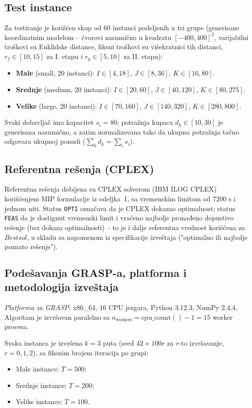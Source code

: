 \documentclass[12pt,a4paper]{article}
\begin{document}
\subsection{Test instance}

Za testiranje je korišćen skup od $60$ instanci podeljenih u tri grupe
(generisane koordinatnim modelom -- čvorovi nasumično u kvadratu
$[-400,400]^2$, varijabilni troškovi su Euklidske distance, fiksni troškovi
su višekratnici tih distanci, $r_f \in [10,15]$ za I. etapu i
$r_g \in [5,10]$ za II. etapu):
\begin{itemize}
  \item \textbf{Male} (small, 20 instanci): $I \in [4, 18]$, $J \in [8, 36]$, $K \in [16, 80]$.
  \item \textbf{Srednje} (medium, 20 instanci): $I \in [20, 60]$, $J \in [40, 120]$, $K \in [80, 275]$.
  \item \textbf{Velike} (large, 20 instanci): $I \in [70, 160]$, $J \in [140, 320]$, $K \in [280, 800]$.
\end{itemize}
Svaki dobavljač ima kapacitet $s_i = 80$; potražnja kupaca $d_k \in [10,30]$
je generisana nasumično, a zatim normalizovana tako da ukupna potražnja
tačno odgovara ukupnoj ponudi ($\sum_k d_k = \sum_i s_i$).

\subsection{Referentna rešenja (CPLEX)}

Referentna rešenja dobijena su CPLEX solverom (IBM ILOG CPLEX) korišćenjem
MIP formulacije iz odeljka~1, sa vremenskim limitom od $7200$ s i jednom niti.
Status \texttt{OPTI} označava da je CPLEX dokazao optimalnost; status
\texttt{FEAS} da je dostignut vremenski limit i vraćeno najbolje pronađeno
dopustivo rešenje (bez dokaza optimalnosti) -- to je i dalje referentna
vrednost korišćena za $Bestsol$, u skladu sa napomenom iz specifikacije
izveštaja ("optimalno ili najbolje poznato rešenje").


\subsection{Podešavanja GRASP-a, platforma i metodologija izveštaja}

\textit{Platforma za GRASP}: x86\_64, 16 CPU jezgara, Python 3.12.3,
NumPy 2.4.4. Algoritam je izvršavan paralelno sa
$n_{\text{workers}} = \text{cpu\_count}()-1 = 15$ worker procesa.

Svaka instanca je izvršena $k=3$ puta (seed $42 + 100r$ za $r$-to
izvršavanje, $r=0,1,2$), sa fiksnim brojem iteracija po grupi:
\begin{itemize}
  \item Male instance: $T = 500$;
  \item Srednje instance: $T = 200$;
  \item Velike instance: $T = 100$.
\end{itemize}
\end{document}
